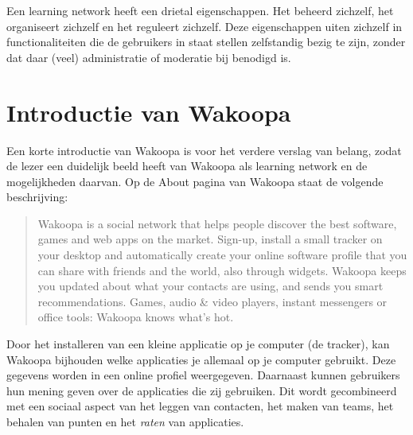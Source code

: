 \documentclass[a4paper, 10pt, pdftex]{report}
\begin{document}
            Een learning network heeft een drietal eigenschappen. Het beheerd zichzelf, het organiseert zichzelf en het reguleert zichzelf. Deze eigenschappen uiten zichzelf in functionaliteiten die de gebruikers in staat stellen zelfstandig bezig te zijn, zonder dat daar (veel) administratie of moderatie bij benodigd is.

    \section{Introductie van Wakoopa}
      Een korte introductie van Wakoopa is voor het verdere verslag van belang, zodat de lezer een duidelijk beeld heeft van Wakoopa als learning network en de mogelijkheden daarvan. Op de About pagina van Wakoopa \citep{Gaal2007} staat de volgende beschrijving:
        \begin{quote} Wakoopa is a social network that helps people discover the best software, games and web apps on the market. Sign-up, install a small tracker on your desktop and automatically create your online software profile that you can share with friends and the world, also through widgets. Wakoopa keeps you updated about what your contacts are using, and sends you smart recommendations. Games, audio \& video players, instant messengers or office tools: Wakoopa knows what's hot.
        \end{quote}
      Door het installeren van een kleine applicatie op je computer (de tracker), kan Wakoopa bijhouden welke applicaties je allemaal op je computer gebruikt. Deze gegevens worden in een online profiel weergegeven. Daarnaast kunnen gebruikers hun mening geven over de applicaties die zij gebruiken. Dit wordt gecombineerd met een sociaal aspect van het leggen van contacten, het maken van teams, het behalen van punten en het \emph{raten} van applicaties.
\end{document}
